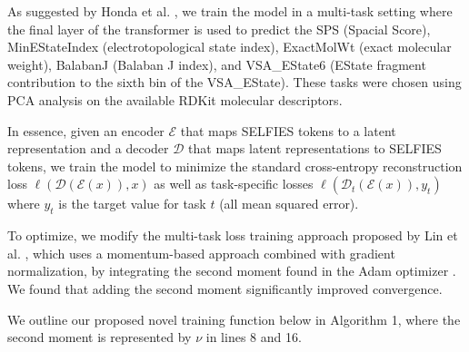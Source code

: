 \documentclass[11pt]{article}
\begin{document}
As suggested by Honda et al. \cite{honda2019smilestransformerpretrainedmolecular}, we train the model in a 
multi-task setting where the final layer of the transformer 
is used to predict the SPS (Spacial Score), MinEStateIndex 
(electrotopological state index), ExactMolWt (exact molecular
weight), BalabanJ (Balaban J index), and VSA\_EState6 (EState
fragment contribution to the sixth bin of the VSA\_EState). 
These tasks were chosen using PCA analysis on the available
RDKit \cite{rdkit} molecular descriptors. 

In essence, given an encoder $\mathcal{E}$ that maps SELFIES tokens
to a latent representation and a decoder $\mathcal{D}$ that maps
latent representations to SELFIES tokens, we train the model
to minimize the standard cross-entropy reconstruction loss 
$\ell(\mathcal{D}(\mathcal{E}(x)), x)$ as well as task-specific 
losses $\ell(\mathcal{D}_t(\mathcal{E}(x)), y_t)$ where $y_t$ is the
target value for task $t$ (all mean squared error). 

To optimize, we 
modify the multi-task loss training approach proposed by Lin et al.
\cite{lin2023dualbalancingmultitasklearning},
which uses a momentum-based approach combined with gradient normalization,
by integrating the second moment found in the Adam optimizer \cite{kingma2017adammethodstochasticoptimization}. We found that adding the second moment significantly improved convergence. 

We outline our proposed novel training function below in Algorithm 1, where 
the second moment is represented by $\nu$ in lines 8 and 16. 
\end{document}
